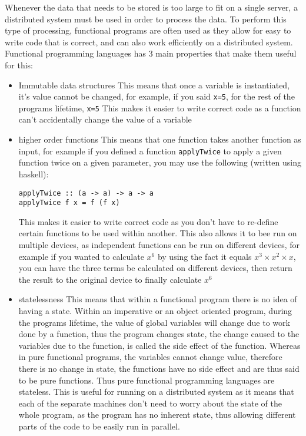 Whenever the data that needs to be stored is too large to fit on a single server, a distributed system must be used in order to process the data. To perform this type of processing, functional programs are often used as they allow for easy to write code that is correct, and can also work efficiently on a distributed system. Functional programming languages has 3 main properties that make them useful for this: 
\begin{itemize}
	\item Immutable data structures
		\subitem This means that once a variable is instantiated, it's value cannot be changed, for example, if you said \verb|x=5|, for the rest of the programs lifetime, \verb|x=5|
		\subitem This makes it easier to write correct code as a function can't accidentally change the value of a variable
	\item higher order functions
		\subitem This means that one function takes another function as input, for example if you defined a function \verb|applyTwice| to apply a given function twice on a given parameter, you may use the following (written using haskell):
		\begin{verbatim}
applyTwice :: (a -> a) -> a -> a  
applyTwice f x = f (f x)  
		\end{verbatim}
		\subitem This makes it easier to write correct code as you don't have to re-define certain functions to be used within another. This also allows it to bee run on multiple devices, as independent functions can be run on different devices, for example if you wanted to calculate $x^6$ by using the fact it equals $x^3 \times x^2 \times x$, you can have the three terms be calculated on different devices, then return the result to the original device to finally calculate $x^6$
	\item statelessness
		\subitem This means that within a functional program there is no idea of having a state. Within an imperative or an object oriented program, during the programs lifetime, the value of global variables will change due to work done by a function, thus the program changes state, the change caused to the variables due to the function, is called the side effect of the function. Whereas in pure functional programs, the variables cannot change value, therefore there is no change in state, the functions have no side effect and are thus said to be pure functions. Thus pure functional programming languages are stateless.
		\subitem This is useful for running on a distributed system as it means that each of the separate machines don't need to worry about the state of the whole program, as the program has no inherent state, thus allowing different parts of the code to be easily run in parallel.
\end{itemize}

